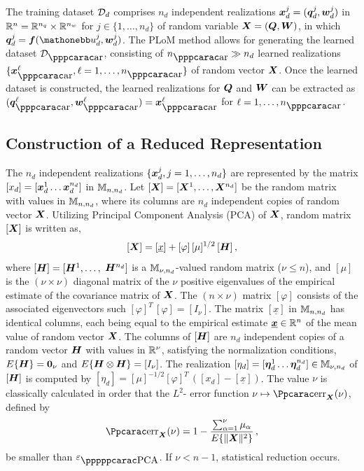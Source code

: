 The training dataset ${\mathcal{D}}_d$ comprises $n_d$ independent realizations ${\boldsymbol{x}}_d^j= ({\boldsymbol{q}}_d^j,{\boldsymbol{w}}_d^j)$ in ${\mathbb{R}}^{n} = {\mathbb{R}}^{n_q}\times {\mathbb{R}}^{n_w}$ for $j\in\{1,\ldots , n_d\}$ of random variable ${\boldsymbol{X}}=({\boldsymbol{Q}},{\boldsymbol{W}})$, in which $\bfq_d^j= \bff(\uu_d^j,\bfw_d^j)$. The PLoM method allows for generating the learned dataset $\curD_\ar$, consisting of $n_\ar\gg n_d$  learned realizations $\{\bfx_\ar^{\ell},\ell = 1, \ldots ,n_\ar\}$ of random vector ${\boldsymbol{X}}$.
Once the learned dataset is constructed, the learned realizations for ${\boldsymbol{Q}}$ and ${\boldsymbol{W}}$ can be extracted as $(\bfq_\ar^\ell,\bfw_\ar^\ell) = \bfx_\ar^\ell$ for $\ell = 1, \ldots ,n_\ar$.

\subsection{Construction of a Reduced Representation}
\label{sec:PLoM.1}
%
The $n_d$ independent realizations $\{{\boldsymbol{x}}_d^j , j=1,\ldots , n_d\}$ are represented by the matrix $[x_d]= [{\boldsymbol{x}}_d^1 \ldots {\boldsymbol{x}}_d^{n_d}]$ in ${\mathbb{M}}_{n,n_d}$. Let $[{\boldsymbol{X}}]= [{\boldsymbol{X}}^1,\ldots ,{\boldsymbol{X}}^{n_d}]$ be the random matrix with values in ${\mathbb{M}}_{n,n_d}$, where its columns are $n_d$ independent copies of random vector ${\boldsymbol{X}}$. Utilizing Principal Component Analysis (PCA) of ${\boldsymbol{X}}$, random matrix $[{\boldsymbol{X}}]$ is written as,
%
\begin{equation}\label{eqPLoM1}
[{\boldsymbol{X}}] = [\underline x] + [\varphi]\, [\mu]^{1/2}\, [{\boldsymbol{H}}]\, ,
\end{equation}
%
where $[{\boldsymbol{H}}] = [{\boldsymbol{H}}^1,\ldots ,$ ${\boldsymbol{H}}^{n_d}]$ is a ${\mathbb{M}}_{\nu,n_d}$-valued random matrix ($\nu\leq n$), and $[\mu]$ is the $(\nu\times\nu)$ diagonal matrix of the $\nu$ positive eigenvalues of the empirical estimate of the covariance matrix of ${\boldsymbol{X}}$. The $(n\times\nu)$ matrix $[\varphi]$ consists of the associated eigenvectors such $[\varphi]^T\,[\varphi]= [I_{\nu}]$. The matrix $[\underline x]$ in ${\mathbb{M}}_{n,n_d}$ has identical columns, each being equal to the empirical estimate $\underline{{\boldsymbol{x}}}\in{\mathbb{R}}^{n}$ of the mean value of random vector ${\boldsymbol{X}}$. The columns of $[{\boldsymbol{H}}]$ are $n_d$ independent copies of a random vector ${\boldsymbol{H}}$ with values in ${\mathbb{R}}^{\nu}$, satisfying the normalization conditions, $E\{{\boldsymbol{H}}\}={ \hbox{\bf 0} }_\nu$ and $E\{{\boldsymbol{H}}\otimes {\boldsymbol{H}}\}= [I_\nu]$. The realization $[\eta_d] = [{\boldsymbol{\eta}}^{1}_d \ldots {\boldsymbol{\eta}}^{n_d}_d] \in {\mathbb{M}}_{\nu,n_d}$ of $[{\boldsymbol{H}}]$  is computed by $[\eta_d] =  [\mu]^{-1/2} [\varphi]^T\, ([x_d] - [\underline x])$. The value $\nu$ is classically calculated in order that the $L^2$- error function $\nu\mapsto \err_\bfX(\nu)$, defined by
\begin{equation}\label{eqPLoM2}
\err_\bfX(\nu) = 1 - \frac{\sum_{\alpha=1}^\nu \mu_\alpha}{E\{\Vert\bfX\Vert^2\}} \, ,
\end{equation}
%
be smaller than $\varepsilon_\PCA$. If $\nu < n-1$, statistical reduction occurs.

